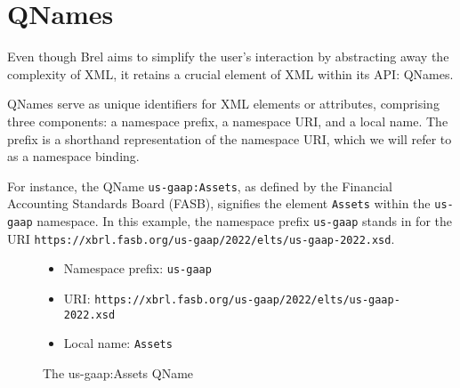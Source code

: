 \section{QNames}
\label{sec:qnames}





Even though Brel aims to simplify the user's interaction by abstracting away the complexity of XML,
it retains a crucial element of XML within its API: QNames.

QNames serve as unique identifiers for XML elements or attributes,
comprising three components: a namespace prefix, a namespace URI, and a local name.
The prefix is a shorthand representation of the namespace URI, which we will refer to as a namespace binding.

For instance, the QName \texttt{us-gaap:Assets}, as defined by the Financial Accounting Standards Board (FASB)\cite{fasb},
signifies the element \texttt{Assets} within the \texttt{us-gaap} namespace.
In this example, the namespace prefix \texttt{us-gaap} stands in for the URI \texttt{https://xbrl.fasb.org/us-gaap/2022/elts/us-gaap-2022.xsd}\cite{fasb}.

\begin{figure}[H]
    \caption{The us-gaap:Assets QName}
    \label{fig:qname_us_gaap_assets}
    \begin{itemize}
        \item Namespace prefix: \texttt{us-gaap}
        \item URI: \texttt{https://xbrl.fasb.org/us-gaap/2022/elts/us-gaap-2022.xsd}
        \item Local name: \texttt{Assets}
    \end{itemize}
\end{figure}

